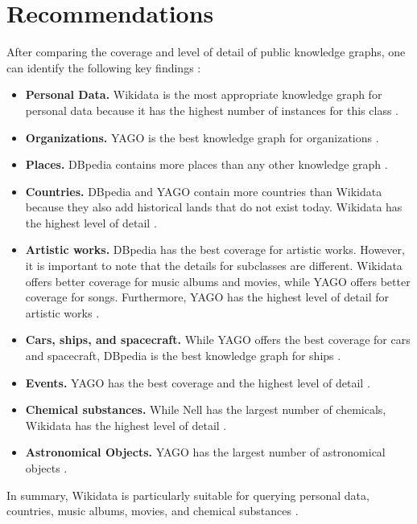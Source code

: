 ﻿\documentclass[11pt,titlepage,oneside,openany]{book}
\begin{document}
\section{Recommendations}
After comparing the coverage and level of detail of public knowledge graphs, one can identify the following key findings \cite{Ringler2017OneKG}:
\begin{itemize}
	\item \textbf{Personal Data.} Wikidata is the most appropriate knowledge graph for personal data because it has the highest number of instances for this class \cite{Ringler2017OneKG}. 
	\item \textbf{Organizations.} YAGO is the best knowledge graph for organizations \cite{Ringler2017OneKG}.
	\item \textbf{Places.} DBpedia contains more places than any other knowledge graph \cite{Ringler2017OneKG}. 
	\item \textbf{Countries.} DBpedia and YAGO contain more countries than Wikidata because they also add historical lands that do not exist today. Wikidata has the highest level of detail \cite{Ringler2017OneKG}. 
	\item \textbf{Artistic works.} DBpedia has the best coverage for artistic works. However, it is important to note that the details for subclasses are different. Wikidata offers better coverage for music albums and movies, while YAGO offers better coverage for songs. Furthermore, YAGO has the highest level of detail for artistic works \cite{Ringler2017OneKG}. 
	\item \textbf{Cars, ships, and spacecraft.} While YAGO offers the best coverage for cars and spacecraft, DBpedia is the best knowledge graph for ships \cite{Ringler2017OneKG}. 
	\item \textbf{Events.} YAGO has the best coverage and the highest level of detail \cite{Ringler2017OneKG}.
	\item \textbf{Chemical substances.} While Nell has the largest number of chemicals, Wikidata has the highest level of detail \cite{Ringler2017OneKG}. 
	\item \textbf{Astronomical Objects.} YAGO has the largest number of astronomical objects \cite{Ringler2017OneKG}.
\end{itemize}
In summary, Wikidata is particularly suitable for querying personal data, countries, music albums, movies, and chemical substances \cite{Ringler2017OneKG}.
\\
\\
\end{document}
